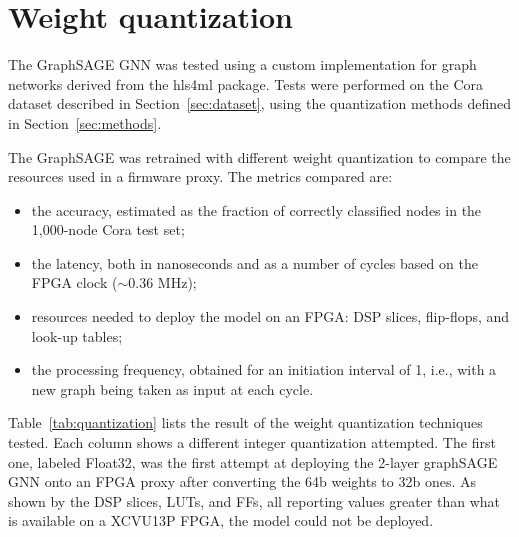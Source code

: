 \documentclass{IEEEtran}
\begin{document}
\section{Weight quantization}
\label{sec:results}

The GraphSAGE GNN was tested using a custom implementation for graph networks derived from the hls4ml package. Tests were performed on the Cora dataset described in Section~\ref{sec:dataset}, using the quantization methods defined in Section~\ref{sec:methods}.

The GraphSAGE was retrained with different weight quantization to compare the resources used in a firmware proxy. The metrics compared are:
\begin{itemize}
    \item the accuracy, estimated as the fraction of correctly classified nodes in the 1,000-node Cora test set;
    \item the latency, both in nanoseconds and as a number of cycles based on the FPGA clock (${\sim}0.36$ MHz);
    \item resources needed to deploy the model on an FPGA: DSP slices, flip-flops, and look-up tables;
    \item the processing frequency, obtained for an initiation interval of 1, i.e., with a new graph being taken as input at each cycle.
\end{itemize}

Table~\ref{tab:quantization} lists the result of the weight quantization techniques tested. Each column shows a different integer quantization attempted. The first one, labeled Float32, was the first attempt at deploying the 2-layer graphSAGE GNN onto an FPGA proxy after converting the 64b weights to 32b ones. As shown by the DSP slices, LUTs, and FFs, all reporting values greater than what is available on a XCVU13P FPGA, the model could not be deployed.
\end{document}
